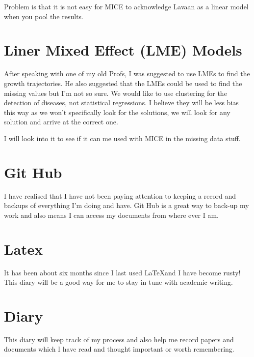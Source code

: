 \documentclass[12pt,letterpaper]{article}
\begin{document}
Problem is that it is not easy for MICE to acknowledge Lavaan as a linear model when you pool the results.  
\section*{Liner Mixed Effect (LME) Models} %
\label{sec:liner_mixed_effec_}
After speaking with one of my old Profs, I was suggested to use LMEs to find the growth trajectories. He also suggested that the LMEs could be used to find the missing values but I'm not so sure. We would like to use clustering for the detection of diseases, not statistical regressions. I believe they will be less bias this way as we won't specifically look for the solutions, we will look for any solution and arrive at the correct one. 

I will look into it to see if it can me used with MICE in the missing data stuff. 
\section*{Git Hub} %
\label{sec:git_hub}
I have realised that I have not been paying attention to keeping a record and backups of everything I'm doing and have. Git Hub is a great way to back-up my work and also means I can access my documents from where ever I am. 
\section*{Latex} %
\label{sec:latex}
It has been about six months since I last used \LaTeX and I have become rusty! This diary will be a good way for me to stay in tune with academic writing. 
\section*{Diary} %
\label{sec:diary}
This diary will keep track of my process and also help me record papers and documents which I have read and thought important or worth remembering. 
\end{document}
